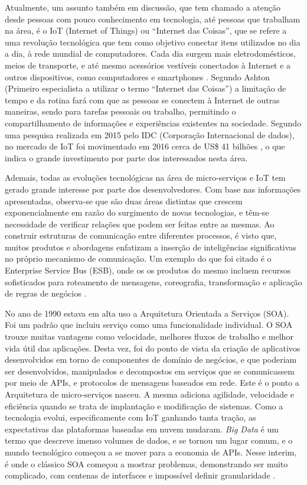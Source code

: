 \documentclass[journal]{IEEEtran}
\begin{document}
Atualmente, um assunto também em discussão, que tem chamado a atenção desde pessoas com pouco conhecimento em tecnologia, até pessoas que trabalham na área, é o IoT (Internet of Things) ou “Internet das Coisas”, que se refere a uma revolução tecnológica que tem como objetivo conectar itens utilizados no dia a dia, à rede mundial de computadores. Cada dia surgem mais eletrodomésticos, meios de transporte, e até mesmo acessórios vestíveis conectados à Internet e a outros dispositivos, como computadores e smartphones \cite{PedroZambarda}. Segundo Ashton (Primeiro especialista a utilizar o termo “Internet das Coisas”) \cite{Finep} a limitação de tempo e da rotina fará com que as pessoas se conectem à Internet de outras maneiras, sendo para tarefas pessoais ou trabalho, permitindo o compartilhamento de informações e experiências existentes na sociedade. Segundo uma pesquisa realizada em 2015 pelo IDC (Corporação Internacional de dados), no mercado de IoT foi movimentado em 2016 cerca de US\$ 41 bilhões \cite{idc2017}, o que indica o grande investimento por parte dos interessados nesta área. 

Ademais, todas as evoluções tecnológicas na área de micro-serviços e IoT tem gerado grande interesse por parte dos desenvolvedores. Com base nas informações apresentadas, observa-se que são duas áreas distintas que crescem exponencialmente em razão do surgimento de novas tecnologias, e têm-se necessidade de verificar relações que podem ser feitas entre as mesmas.  Ao construir estruturas de comunicação entre diferentes processos, é visto que, muitos produtos e abordagens enfatizam a inserção de inteligências significativas no próprio mecanismo de comunicação. Um exemplo do que foi citado é o Enterprise Service Bus (ESB), onde os os produtos do mesmo incluem recursos sofisticados para roteamento de mensagens, coreografia, transformação e aplicação de regras de negócios \cite{martinfowleretal}. 

No ano de 1990 estava em alta uso a Arquitetura Orientada a Serviços (SOA). Foi um padrão que incluiu serviço como uma funcionalidade individual. O SOA trouxe muitas vantagens como velocidade, melhores fluxos de trabalho e melhor vida útil das aplicações. Desta vez, foi do ponto de vista da criação de aplicativos desenvolvidos em torno de componentes de domínio de negócios, e que poderiam ser desenvolvidos, manipulados e decompostos em serviços que se comunicassem por meio de APIs, e protocolos de mensagens baseados em rede. Este é o ponto a Arquitetura de micro-serviços nasceu. A mesma adiciona agilidade, velocidade e eficiência quando se trata de implantação e modificação de sistemas. Como a tecnologia evolui, especificamente com IoT ganhando tanta tração, as expectativas das plataformas baseadas em nuvem mudaram. \emph{Big Data} é um termo que descreve imenso volumes de dados, e se tornou um lugar comum, e o mundo tecnológico começou a se mover para a economia de APIs. Nesse interim, é onde o clássico SOA começou a mostrar problemas, demonstrando ser muito complicado, com centenas de interfaces e impossível definir granularidade \cite{manutayal2016}.
\end{document}
